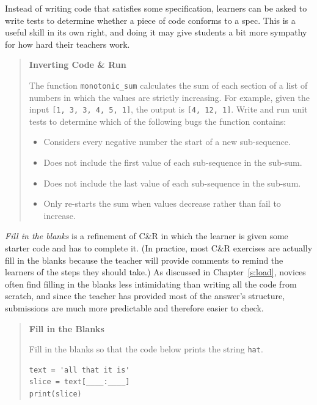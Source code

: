 Instead of writing code that satisfies some specification, learners can
be asked to write tests to determine whether a piece of code conforms to
a spec. This is a useful skill in its own right, and doing it may give
students a bit more sympathy for how hard their teachers work.

\begin{quote}\setlength{\parindent}{0pt}
\textbf{Inverting Code \& Run}

The function \texttt{monotonic\_sum} calculates the sum of each section of a
list of numbers in which the values are strictly increasing. For
example, given the input \texttt{{[}1,\ 3,\ 3,\ 4,\ 5,\ 1{]}}, the output is
\texttt{{[}4,\ 12,\ 1{]}}. Write and run unit tests to determine which of the
following bugs the function contains:

\begin{itemize}
\item
  Considers every negative number the start of a new sub-sequence.
\item
  Does not include the first value of each sub-sequence in the
  sub-sum.
\item
  Does not include the last value of each sub-sequence in the
  sub-sum.
\item
  Only re-starts the sum when values decrease rather than fail to
  increase.
\end{itemize}
\end{quote}

\emph{Fill in the blanks} is a refinement of C\&R in which the learner is
given some starter code and has to complete it. (In practice, most C\&R
exercises are actually fill in the blanks because the teacher will
provide comments to remind the learners of the steps they should take.)
As discussed in Chapter~\ref{s:load}, novices often find filling in the
blanks less intimidating than writing all the code from scratch, and
since the teacher has provided most of the answer's structure,
submissions are much more predictable and therefore easier to check.

\begin{quote}\setlength{\parindent}{0pt}
\textbf{Fill in the Blanks}

Fill in the blanks so that the code below prints the string \texttt{\textquotesingle{}hat\textquotesingle{}}.

\begin{verbatim}
text = 'all that it is'
slice = text[____:____]
print(slice)
\end{verbatim}
\end{quote}

